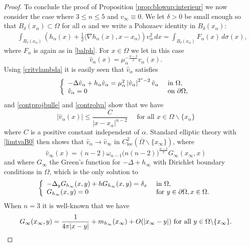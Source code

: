 \documentclass[10pt]{amsart}
\numberwithin{equation}{section}
\newcommand{\Om}{\Omega}
\newcommand{\ma}{\mu_\alpha}
\def \bb{\hbox}
\def \xl{x_\alpha}
\def \ma{\mu_{\alpha}}
\def \hva{\hat{v}_{\alpha}}
\def \va{v_{\alpha}}
\def \ha{h_{\alpha}}
\def \hi{h_{\infty}}
\def \r {\rangle}
\def \l{\langle}
\DeclareMathOperator{\loc}{loc}
\theoremstyle{plain}
\theoremstyle{remark}
\begin{document}
\begin{proof}
To conclude the proof of Proposition \ref{prop:blowup:interieur} we now consider the case where $3 \le n \le 5$ and $v_\infty \equiv 0$. We let $\delta >0$ be small enough so that $B_{\delta}(x_\alpha) \subset \Om$ for all $\alpha$ and we write a Pohozaev identity in $B_{\delta}(x_\alpha)$:
	\begin{eqnarray}\label{poa1:u00}
		&&\int_{B_{\delta}(x_\alpha)}\left(\ha(x)+\frac12 \l\nabla \ha(x),x-\xl \r\right)  \va^2\, dx =\int_{B_{\delta}(x_\alpha)}  F_{\alpha}(x) \,  d\sigma(x),
	\end{eqnarray}
where $F_\alpha$ is again as in \eqref{balph}. For $x\in\Om$ we let in this case
		\begin{equation*}
			\hva(x)= \ma^{-\frac{n-2}{2}} \va(x). 
		\end{equation*}
Using \eqref{critvlambda} it is easily seen that $\hva$ satisfies 
		\begin{equation*}
			\left\{\begin{array}{ll}
				-\Delta \hva +h_\alpha \hva=\ma^2 \left|\hva\right|^{2^*-2}\hva &\hbox{ in } \Om, \\
				\hva= 0  &\hbox{ on } \partial \Om,
			\end{array}\right.
		\end{equation*}
and \eqref{contprojbulle} and  \eqref{controlva} show that we have 
$$ |\hva(x)| \le \frac{C}{|x-x_{\alpha}|^{n-2}} \quad \text{ for all } x \in \Om \backslash \{x_\alpha\} $$
where $C$ is a positive constant independent of $\alpha$. Standard elliptic theory with \eqref{limtvaB0} then shows that $ \hva \to \hat{v}_{\infty}$ in $C_{\loc}^2(\overline{\Om} \backslash\{x_\infty\})$, where
$$ \hat{v}_{\infty}(x) = (n-2)\omega_{n-1} \big(n(n-2)\big)^{\frac{n-2}{2}} G_\infty(x_\infty, x)$$
and where $G_\infty$ the Green's function for $-\Delta + \hi$ with Dirichlet boundary conditions in $\Om$, which is the only solution to 
\begin{equation*}	
		\left\{\begin{array}{ll}
			-\Delta_{y} G_{h_\infty}(x,y)+h G_{h_\infty}(x,y)=\delta_{x}&\hbox{ in } \Omega, \\
			 G_{h_\infty}(x,y)= 0  &\hbox{ for } y\in \partial \Om, x\in \Om.
		\end{array}\right.
	\end{equation*}
When $n=3$ it is well-known that we have 
\begin{equation*}
		G_{\infty}(x_\infty,y)=\frac{1}{4\pi |x-y|}+m_{h_\infty}(x_\infty) + O(|x_\infty-y|)  \bb{ for all } y\in \Om\backslash \{x_\infty\}.

\end{equation*}
\end{proof}
\end{document}
